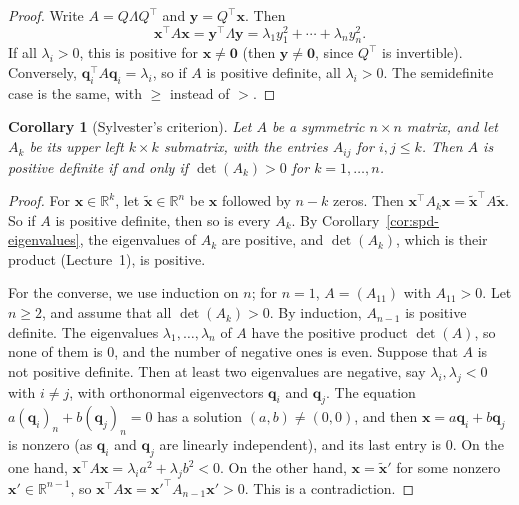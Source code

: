 \documentclass[11pt]{article}
\theoremstyle{definition}
\theoremstyle{plain}
\newtheorem{corollary}[definition]{Corollary}
\theoremstyle{remark}
\begin{document}
\begin{proof}
    Write $A = Q\Lambda Q^\top$ and $\mathbf{y} = Q^\top \mathbf{x}$. Then
    \[\mathbf{x}^\top A \mathbf{x} = \mathbf{y}^\top \Lambda \mathbf{y} = \lambda_1 y_1^2 + \cdots + \lambda_n y_n^2.\]
    If all $\lambda_i > 0$, this is positive for $\mathbf{x} \neq \mathbf{0}$ (then $\mathbf{y} \neq \mathbf{0}$, since $Q^\top$ is invertible). Conversely, $\mathbf{q}_i^\top A \mathbf{q}_i = \lambda_i$, so if $A$ is positive definite, all $\lambda_i > 0$. The semidefinite case is the same, with $\geq$ instead of $>$.
\end{proof}

\begin{corollary}[Sylvester's criterion]\label{cor:sylvester}
    Let $A$ be a symmetric $n \times n$ matrix, and let $A_k$ be its upper left $k \times k$ submatrix, with the entries $A_{ij}$ for $i, j \leq k$. Then $A$ is positive definite if and only if $\det(A_k) > 0$ for $k = 1, \ldots, n$.
\end{corollary}

\begin{proof}
    For $\mathbf{x} \in \mathbb{R}^k$, let $\tilde{\mathbf{x}} \in \mathbb{R}^n$ be $\mathbf{x}$ followed by $n - k$ zeros. Then $\mathbf{x}^\top A_k \mathbf{x} = \tilde{\mathbf{x}}^\top A\tilde{\mathbf{x}}$. So if $A$ is positive definite, then so is every $A_k$. By Corollary~\ref{cor:spd-eigenvalues}, the eigenvalues of $A_k$ are positive, and $\det(A_k)$, which is their product (Lecture~1), is positive.

    For the converse, we use induction on $n$; for $n = 1$, $A = (A_{11})$ with $A_{11} > 0$. Let $n \geq 2$, and assume that all $\det(A_k) > 0$. By induction, $A_{n-1}$ is positive definite. The eigenvalues $\lambda_1, \ldots, \lambda_n$ of $A$ have the positive product $\det(A)$, so none of them is $0$, and the number of negative ones is even. Suppose that $A$ is not positive definite. Then at least two eigenvalues are negative, say $\lambda_i, \lambda_j < 0$ with $i \neq j$, with orthonormal eigenvectors $\mathbf{q}_i$ and $\mathbf{q}_j$. The equation $a(\mathbf{q}_i)_n + b(\mathbf{q}_j)_n = 0$ has a solution $(a, b) \neq (0, 0)$, and then $\mathbf{x} = a\mathbf{q}_i + b\mathbf{q}_j$ is nonzero (as $\mathbf{q}_i$ and $\mathbf{q}_j$ are linearly independent), and its last entry is $0$. On the one hand, $\mathbf{x}^\top A\mathbf{x} = \lambda_i a^2 + \lambda_j b^2 < 0$. On the other hand, $\mathbf{x} = \tilde{\mathbf{x}}'$ for some nonzero $\mathbf{x}' \in \mathbb{R}^{n-1}$, so $\mathbf{x}^\top A\mathbf{x} = \mathbf{x}'^\top A_{n-1}\mathbf{x}' > 0$. This is a contradiction.
\end{proof}
\end{document}
